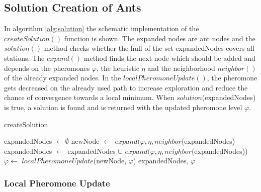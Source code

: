 \subsection{Solution Creation of Ants}
In algorithm \ref{alg:solution} the schematic implementation of the $createSolution()$ function is shown. The expanded nodes are ant nodes and the $solution()$ method checks whether the hull of the set expandedNodes covers all stations. The $expand()$ method finds the next node which should be added and depends on the pheromones $\varphi$, the heuristic $\eta$ and the neighborhood $neighbor()$ of the already expanded nodes. In the $localPheromoneUpdate()$, the pheromone gets decreased on the already used path to increase exploration and reduce the chance of convergence towards a local minimum. When $solution$(expandedNodes) is true, a solution is found and is returned with the updated pheromone level $\varphi$.
\begin{algorithm}[h]
	\caption{createSolution}
	\label{alg:solution}
	\begin{algorithmic}[1]
		\State expandedNodes $\gets \emptyset$
		\State newNode $\gets$ $expand(\varphi, \eta, neighbor$(expandedNodes)
		\State expandedNodes $\gets$ expandedNodes $\cup$ $expand(\varphi, \eta, neighbor$(expandedNodes))
		\State $\varphi \gets$ $localPheromoneUpdate$(newNode, $\varphi$)
		\EndWhile
		\State \Return expandedNodes, $\varphi$
	\end{algorithmic}
\end{algorithm}

\subsubsection{Local Pheromone Update}

